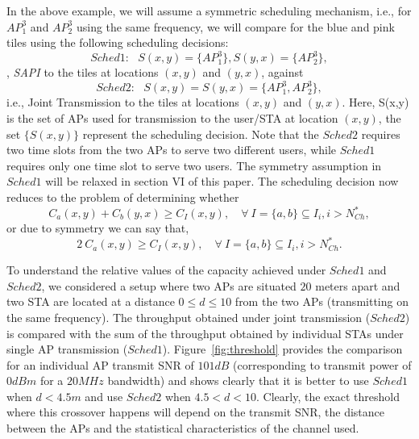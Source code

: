 In the above example, we will assume a symmetric scheduling mechanism, i.e., for $AP_1^3$ and $AP_2^3$ using the same frequency, we will compare for the blue and pink tiles using the following scheduling decisions:
\[{{Sched1}}:\ \ \ S(x,y) = \{AP_1^3\}, S(y,x) = \{AP_2^3\},\]
\ie, \emph{SAPI} to the tiles at locations $(x,y)$ and $(y,x)$, against
\[{Sched2}:\ \ \ S(x,y)=S(y,x)=\{AP_1^3, AP_2^3\},\]
i.e., Joint Transmission to the tiles at locations $(x,y)$ and $(y,x)$.
Here, S(x,y) is the set of APs used for transmission to the user/STA at location $(x,y)$, the set $\{ S(x,y) \}$ represent the scheduling decision.
Note that the ${Sched2}$ requires two time slots from the two APs to serve two different users, while ${Sched1}$ requires only one time slot to serve two users.
The symmetry assumption in $Sched1$ will be relaxed in section VI of this paper. The scheduling decision now reduces to the problem of determining whether
\begin{equation*}
    \label{eq:celledge_sym}
    C_{a}(x,y) + C_{b}(y,x) \geq C_I(x,y), \quad \forall \  I=\{a,b\} \subseteq I_i, i > N_{Ch}^*, %
\end{equation*}
or due to symmetry we can say that,
\begin{equation}
    \label{eq:celledge}
    2 \ C_{a}(x,y) \geq C_I(x,y), \quad \forall \  I=\{a,b\} \subseteq I_i, i > N_{Ch}^*.  %
\end{equation}


To understand the relative values of the capacity achieved under $Sched1$ and $Sched2$, we considered a setup where two APs are situated $20$ meters apart and two STA are located at a distance $0\leq d \leq 10$ from the two APs (transmitting on the same frequency). The throughput obtained under joint transmission ($Sched2$) is compared with the sum of the throughput obtained by individual STAs under single AP transmission ($Sched1$). Figure~\ref{fig:threshold} provides the comparison for an individual AP transmit SNR of $101dB$ (corresponding to transmit power of $0dBm$ for a $20MHz$ bandwidth) and shows clearly that it is better to use $Sched1$ when $d<4.5m$ and use $Sched2$ when $4.5< d < 10$. Clearly, the exact threshold where this crossover happens will depend on the transmit SNR, the distance between the APs and the statistical characteristics of the channel used. 

